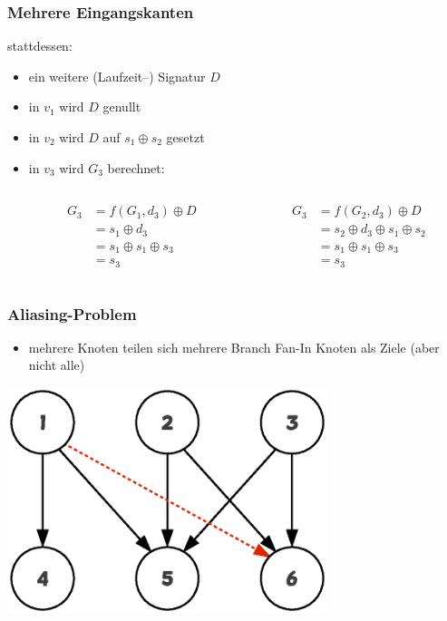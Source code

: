 \documentclass[mathserif,slidestop,compress,red]{beamer}
\begin{document}
\begin{frame}
  \frametitle{Mehrere Eingangskanten}
  stattdessen:
  \begin{itemize}
    \item ein weitere (Laufzeit–) Signatur $D$
    \pause
    \item in $v_1$ wird $D$ genullt
    \pause
    \item in $v_2$ wird $D$ auf $s_1 \oplus s_2$ gesetzt
    \pause
    \item in $v_3$ wird $G_3$ berechnet:
    \begin{columns}
      \begin{column}{0.5\textwidth}
      \begin{align*}
      G_3 &= f(G_1, d_3) \oplus D \\
      &= s_1 \oplus d_3 \\
      &= s_1 \oplus s_1 \oplus s_3 \\
      &= s_3
      \end{align*}
      \end{column}

      \begin{column}{0.5\textwidth}
      \begin{align*}
      G_3 &= f(G_2, d_3) \oplus D \\
      &= s_2 \oplus d_3 \oplus s_1 \oplus s_2 \\
      &= s_1 \oplus s_1 \oplus s_3 \\
      &= s_3
      \end{align*}
      \end{column}
    \end{columns}
  \end{itemize}
\end{frame}

\begin{frame}
  \frametitle{Aliasing-Problem}
  \begin{itemize}
    \item mehrere Knoten teilen sich mehrere Branch Fan-In Knoten als Ziele (aber nicht alle)
  \end{itemize}
  \begin{center}
  \includegraphics[width=0.7\textwidth]{aliasing}
  \end{center}
\end{frame}
\end{document}
